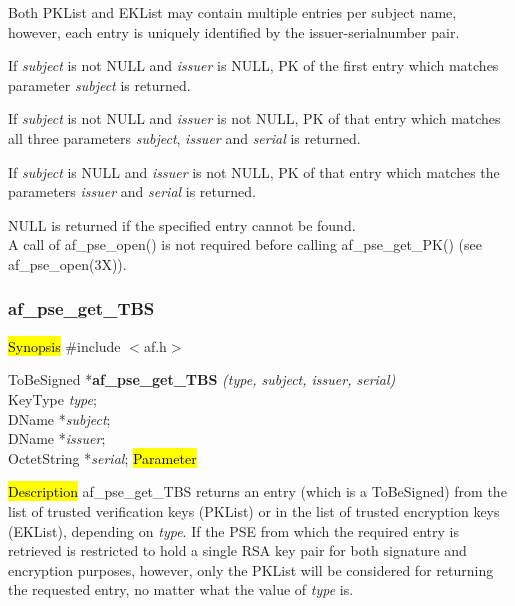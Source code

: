 Both PKList and EKList may contain multiple entries per subject name, however,
each entry is uniquely identified by the issuer-serialnumber pair.

If {\em subject} is not NULL and {\em issuer} is NULL, PK of the first entry which
matches parameter {\em subject} is returned.

If {\em subject} is not NULL and {\em issuer} is not NULL, PK of that entry which 
matches all three parameters {\em subject}, {\em issuer} and {\em serial} is returned.
 
If {\em subject} is NULL and {\em issuer} is not NULL, PK of that entry which matches the
parameters {\em issuer} and {\em serial} is returned.

NULL is returned if the specified entry cannot be found.
\\ [1em]
A call of af\_pse\_open() is not required before calling af\_pse\_get\_PK()
(see af\_pse\_open(3X)).

\subsubsection{af\_pse\_get\_TBS}
\label{af_search_tbs_Name}
\hl{Synopsis}
\#include $<$af.h$>$

ToBeSigned *{\bf af\_pse\_get\_TBS} {\em (type, subject, issuer, serial)} \\
KeyType {\em type}; \\
DName *{\em subject}; \\
DName *{\em issuer}; \\
OctetString *{\em serial};
\hl{Parameter}




\hl{Description}
af\_pse\_get\_TBS returns an entry (which is a ToBeSigned) from the list of trusted 
verification keys (PKList) or in the list of trusted encryption keys (EKList), depending
on {\em type}.
If the PSE from which the required entry is retrieved is restricted to hold a single RSA key pair
for both signature and encryption purposes, however, only the PKList will be considered for returning the requested entry,
no matter what the value of {\em type} is.

